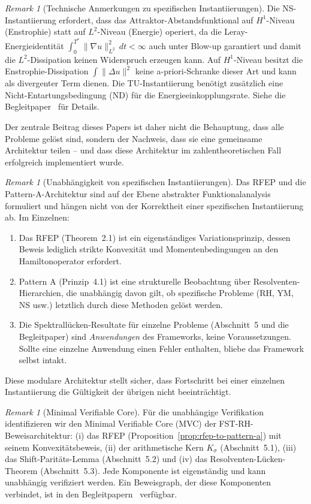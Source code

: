 \documentclass[12pt,a4paper]{article}
\theoremstyle{definition}
\theoremstyle{remark}
\newtheorem{remark}[theorem]{Remark}
\begin{document}
\begin{remark}[Technische Anmerkungen zu spezifischen Instantiierungen]
\label{rem:technical-notes}
Die NS-Instantiierung erfordert, dass das Attraktor-Abstandsfunktional auf $H^1$-Niveau (Enstrophie) statt auf $L^2$-Niveau (Energie) operiert, da die Leray-Energieidentität $\int_0^{T^*}\|\nabla u\|_{L^2}^2\,dt < \infty$ auch unter Blow-up garantiert und damit die $L^2$-Dissipation keinen Widerspruch erzeugen kann. Auf $H^1$-Niveau besitzt die Enstrophie-Dissipation $\int\|\Delta u\|^2$ keine a-priori-Schranke dieser Art und kann als divergenter Term dienen. Die TU-Instantiierung benötigt zusätzlich eine Nicht-Entartungsbedingung (ND) für die Energieeinkopplungsrate. Siehe die Begleitpaper~\cite{Geiger2026-NS,Geiger2026-TU} für Details.
\end{remark}

Der zentrale Beitrag dieses Papers ist daher nicht die Behauptung, dass alle Probleme gelöst sind, sondern der Nachweis, dass sie eine gemeinsame Architektur teilen -- und dass diese Architektur im zahlentheoretischen Fall erfolgreich implementiert wurde.

\begin{remark}[Unabhängigkeit von spezifischen Instantiierungen]
\label{rem:independence}
Das RFEP und die Pattern-A-Architektur sind auf der Ebene abstrakter Funktionalanalysis formuliert und hängen nicht von der Korrektheit einer spezifischen Instantiierung ab. Im Einzelnen:
\begin{enumerate}
\item Das RFEP (Theorem~2.1) ist ein eigenständiges Variationsprinzip, dessen Beweis lediglich strikte Konvexität und Momentenbedingungen an den Hamiltonoperator erfordert.
\item Pattern A (Prinzip~4.1) ist eine strukturelle Beobachtung über Resolventen-Hierarchien, die unabhängig davon gilt, ob spezifische Probleme (RH, YM, NS usw.) letztlich durch diese Methoden gelöst werden.
\item Die Spektrallücken-Resultate für einzelne Probleme (Abschnitt~5 und die Begleitpaper) sind \emph{Anwendungen} des Frameworks, keine Voraussetzungen. Sollte eine einzelne Anwendung einen Fehler enthalten, bliebe das Framework selbst intakt.
\end{enumerate}
Diese modulare Architektur stellt sicher, dass Fortschritt bei einer einzelnen Instantiierung die Gültigkeit der übrigen nicht beeinträchtigt.
\end{remark}

\begin{remark}[Minimal Verifiable Core]
\label{rem:mvc}
Für die unabhängige Verifikation identifizieren wir den Minimal Verifiable Core (MVC) der FST-RH-Beweisarchitektur: (i) das RFEP (Proposition~\ref{prop:rfep-to-pattern-a}) mit seinem Konvexitätsbeweis, (ii) der arithmetische Kern $K_\sigma$ (Abschnitt~5.1), (iii) das Shift-Paritäts-Lemma (Abschnitt~5.2) und (iv) das Resolventen-Lücken-Theorem (Abschnitt~5.3). Jede Komponente ist eigenständig und kann unabhängig verifiziert werden. Ein Beweisgraph, der diese Komponenten verbindet, ist in den Begleitpapern~\cite{Geiger2026a,Geiger2026b,Geiger2026c} verfügbar.
\end{remark}
\end{document}
